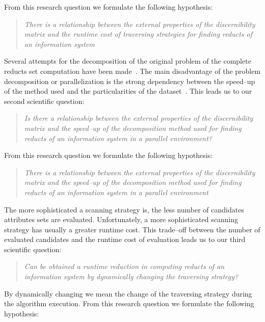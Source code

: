 \documentclass[authoryear,11pt]{elsarticle}
\begin{document}
  From this research question we formulate the following hypothesis:
  
\begin{quote}  
  \emph{There is a relationship between the external properties of the discernibility matrix and the runtime 
  		cost of traversing strategies for finding reducts of an information system}
\end{quote}
  		
  Several attempts for the decomposition of the original problem of the complete reducts set computation have 
  been made~\citep{Strakowski08,Jiao10,Kopczynski14}. The main disadvantage of the problem decomposition or
  parallelization is the strong dependency between the speed--up of the method used and the particularities of 
  the dataset~\citep{Strakowski08}. This leads us to our second scientific question:
  
\begin{quote}
  \emph{Is there a relationship between the external properties of the discernibility matrix and the 
  		speed--up of the decomposition method used for finding reducts of an information system 
  		in a parallel environment?}
\end{quote}

  From this research question we formulate the following hypothesis:
    
\begin{quote}
  \emph{There is a relationship between the external properties of the discernibility matrix and the 
  		speed--up of the decomposition method used for finding reducts of an information
  		system in a parallel environment}
\end{quote}
  
  The more sophisticated a scanning strategy is, the less number of candidates attributes sets are 
  evaluated. Unfortunately, a more sophisticated scanning strategy has usually a greater runtime cost.
  This trade--off between the number of evaluated candidates and the runtime cost of evaluation leads us 
  to our third scientific question:
  
\begin{quote}
  \emph{Can be obtained a runtime reduction in computing reducts of an information system by 
  		dynamically changing the traversing strategy?}
\end{quote}
  By dynamically changing we mean the change of the traversing strategy during the algorithm execution.
  From this research question we formulate the following hypothesis:
    
\end{document}
